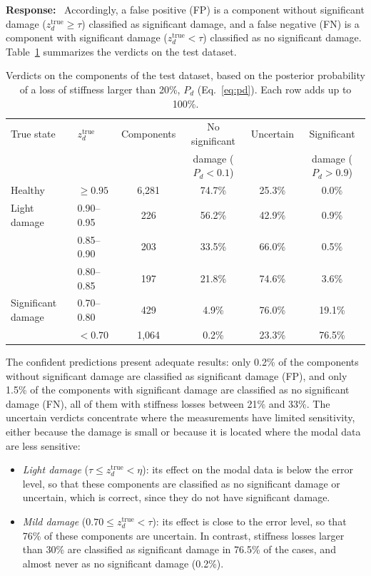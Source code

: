 \documentclass[11pt]{article}
\newenvironment{response}{\par\smallskip\noindent\color{resp}\textbf{Response:}\ }{\par}
\begin{document}
\begin{response}
Accordingly, a false positive (FP) is a component without significant damage ($z_d^{\text{true}}\ge \tau$) classified as significant damage, and a false negative (FN) is a component with significant damage ($z_d^{\text{true}}<\tau$) classified as no significant damage.
Table~\ref{tab:verdicts} summarizes the verdicts on the test dataset.
\begin{table}[H]
	\centering\small
	\caption{Verdicts on the components of the test dataset, based on the posterior probability of a loss of stiffness larger than 20\%, $P_d$ (Eq.~\eqref{eq:pd}). Each row adds up to 100\%.}
	\label{tab:verdicts}
	\begin{tabular}{llcccc}
		\toprule
		True state & $z_d^{\text{true}}$ & Components & No significant & Uncertain & Significant \\
		& & & damage ($P_d<0.1$) & & damage ($P_d>0.9$) \\
		\midrule
		Healthy & $\ge0.95$ & 6,281 & 74.7\% & 25.3\% & 0.0\% \\
		Light damage & 0.90--0.95 & 226 & 56.2\% & 42.9\% & 0.9\% \\
		& 0.85--0.90 & 203 & 33.5\% & 66.0\% & 0.5\% \\
		& 0.80--0.85 & 197 & 21.8\% & 74.6\% & 3.6\% \\
		Significant damage & 0.70--0.80 & 429 &  4.9\% & 76.0\% & 19.1\% \\
		& $<0.70$ & 1,064 & 0.2\% & 23.3\% & 76.5\% \\
		\bottomrule
	\end{tabular}
\end{table}
The confident predictions present adequate results: only 0.2\% of the components without significant damage are classified as significant damage (FP), and only 1.5\% of the components with significant damage are classified as no significant damage (FN), all of them with stiffness losses between 21\% and 33\%.
The uncertain verdicts concentrate where the measurements have limited sensitivity, either because the damage is small or because it is located where the modal data are less sensitive:
\begin{itemize}[leftmargin=*]
	\item \emph{Light damage} ($\tau\le z_d^{\text{true}}<\eta$): its effect on the modal data is below the error level, so that these components are classified as no significant damage or uncertain, which is correct, since they do not have significant damage.
	\item \emph{Mild damage} ($0.70\le z_d^{\text{true}}<\tau$): its effect is close to the error level, so that 76\% of these components are uncertain. In contrast, stiffness losses larger than 30\% are classified as significant damage in 76.5\% of the cases, and almost never as no significant damage (0.2\%).

\end{itemize}
\end{response}
\end{document}
